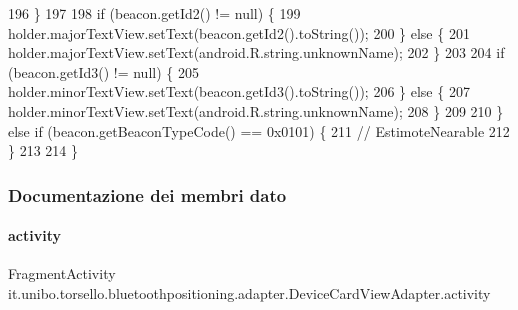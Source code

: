 \begin{DoxyCode}
196             \}
197 
198             \textcolor{keywordflow}{if} (beacon.getId2() != null) \{
199                 holder.majorTextView.setText(beacon.getId2().toString());
200             \} \textcolor{keywordflow}{else} \{
201                 holder.majorTextView.setText(android.R.string.unknownName);
202             \}
203 
204             \textcolor{keywordflow}{if} (beacon.getId3() != null) \{
205                 holder.minorTextView.setText(beacon.getId3().toString());
206             \} \textcolor{keywordflow}{else} \{
207                 holder.minorTextView.setText(android.R.string.unknownName);
208             \}
209 
210         \} \textcolor{keywordflow}{else} \textcolor{keywordflow}{if} (beacon.getBeaconTypeCode() == 0x0101) \{
211             \textcolor{comment}{// EstimoteNearable}
212         \}
213 
214     \}
\end{DoxyCode}


\subsubsection{Documentazione dei membri dato}
\hypertarget{classit_1_1unibo_1_1torsello_1_1bluetoothpositioning_1_1adapter_1_1DeviceCardViewAdapter_ad9b0572ad094da8225f1c2024ac2eb61_ad9b0572ad094da8225f1c2024ac2eb61}{}\label{classit_1_1unibo_1_1torsello_1_1bluetoothpositioning_1_1adapter_1_1DeviceCardViewAdapter_ad9b0572ad094da8225f1c2024ac2eb61_ad9b0572ad094da8225f1c2024ac2eb61} 
\paragraph{\texorpdfstring{activity}{activity}}
{\footnotesize\ttfamily Fragment\+Activity it.\+unibo.\+torsello.\+bluetoothpositioning.\+adapter.\+Device\+Card\+View\+Adapter.\+activity\hspace{0.3cm}{\ttfamily [private]}}

\hypertarget{classit_1_1unibo_1_1torsello_1_1bluetoothpositioning_1_1adapter_1_1DeviceCardViewAdapter_a0d362081de4afb44abc82197aa597a18_a0d362081de4afb44abc82197aa597a18}{}\label{classit_1_1unibo_1_1torsello_1_1bluetoothpositioning_1_1adapter_1_1DeviceCardViewAdapter_a0d362081de4afb44abc82197aa597a18_a0d362081de4afb44abc82197aa597a18} 
